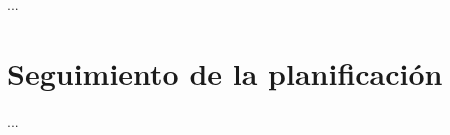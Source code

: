 \documentclass[IB,BIB]{TFUOC}%
\begin{document}

...


\section{Seguimiento de la planificación}
\label{sec:Seguimiento de la planificación}


...


\newpage
\scriptsize

\printglossaries


\newpage
\scriptsize






% 
% 
% 
% 
% 
\end{document}
